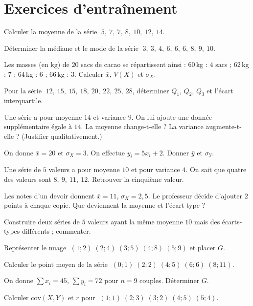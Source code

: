 \section{Exercices d'entraînement}


\exo{} Calculer la moyenne de la série $\;5,\ 7,\ 7,\ 8,\ 10,\ 12,\ 14$.

\exo{} Déterminer la médiane et le mode de la série
$\;3,\ 3,\ 4,\ 6,\ 6,\ 6,\ 8,\ 9,\ 10$.

\exo{} Les masses (en kg) de $20$ sacs de cacao se répartissent ainsi :
$60$\,kg : $4$ sacs ; $62$\,kg : $7$ ; $64$\,kg : $6$ ; $66$\,kg : $3$.
Calculer $\bar x$, $V(X)$ et $\sigma_X$.

\exo{} Pour la série $\;12,\ 15,\ 15,\ 18,\ 20,\ 22,\ 25,\ 28$, déterminer
$Q_1$, $Q_2$, $Q_3$ et l'écart interquartile.

\exo{} Une série a pour moyenne $14$ et variance $9$. On lui ajoute une donnée
supplémentaire égale à $14$. La moyenne change-t-elle ? La variance augmente-t-elle ?
(Justifier qualitativement.)

\exo{} On donne $\bar x=20$ et $\sigma_X=3$. On effectue $y_i=5x_i+2$.
Donner $\bar y$ et $\sigma_Y$.

\exo{} Une série de $5$ valeurs a pour moyenne $10$ et pour variance $4$. On sait que
quatre des valeurs sont $8,\ 9,\ 11,\ 12$. Retrouver la cinquième valeur.

\exo{} Les notes d'un devoir donnent $\bar x=11$, $\sigma_X=2{,}5$. Le professeur
décide d'ajouter $2$ points à chaque copie. Que deviennent la moyenne et l'écart-type ?

\exo{} Construire deux séries de $5$ valeurs ayant la même moyenne $10$ mais des
écarts-types différents ; commenter.


\exo{} Représenter le nuage $\;(1;2)\;(2;4)\;(3;5)\;(4;8)\;(5;9)$ et placer $G$.

\exo{} Calculer le point moyen de la série $\;(0;1)\;(2;2)\;(4;5)\;(6;6)\;(8;11)$.

\exo{} On donne $\sum x_i=45$, $\sum y_i=72$ pour $n=9$ couples. Déterminer $G$.


\exo{} Calculer $\mathrm{cov}(X,Y)$ et $r$ pour
$\;(1;1)\;(2;3)\;(3;2)\;(4;5)\;(5;4)$.

